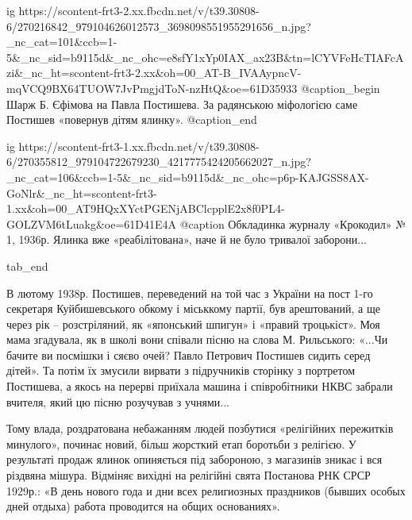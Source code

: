   ig https://scontent-frt3-2.xx.fbcdn.net/v/t39.30808-6/270216842_979104626012573_3698098551955291656_n.jpg?_nc_cat=101&ccb=1-5&_nc_sid=b9115d&_nc_ohc=e8sfY1xYp0IAX_ax23B&tn=lCYVFeHcTIAFcAzi&_nc_ht=scontent-frt3-2.xx&oh=00_AT-B_IVAAypncV-mqVCQ9BX64TUOW7JvPmgjdToN-nzHtQ&oe=61D35933
	@caption_begin
		Шарж Б. Єфімова на Павла Постишева. За радянською міфологією саме Постишев «повернув дітям ялинку».
	@caption_end

  ig https://scontent-frt3-1.xx.fbcdn.net/v/t39.30808-6/270355812_979104722679230_4217775424205662027_n.jpg?_nc_cat=106&ccb=1-5&_nc_sid=b9115d&_nc_ohc=p6p-KAJGSS8AX-GoNlr&_nc_ht=scontent-frt3-1.xx&oh=00_AT9HQxXYctPGENjABClcpplE2x8f0PL4-GOLZVM6tLuakg&oe=61D41E4A
	@caption Обкладинка журналу «Крокодил» № 1, 1936р. Ялинка вже «реабілітована», наче й не було тривалої заборони...

tab_end
\fi

\begin{zznagolos}
\normalsize
В лютому 1938р. Постишев, переведений на той час з України на пост 1-го
секретаря Куйбишевського обкому і міськкому партії, був арештований, а ще
через рік – розстріляний, як «японський шпигун» і «правий троцькіст».
Моя мама згадувала, як в школі вони співали пісню на слова М. Рильського: «...Чи
бачите ви посмішки і сяєво очей?  Павло Петрович Постишев сидить серед дітей».
Та потім їх змусили вирвати з підручників сторінку з портретом Постишева, а
якось на перерві приїхала машина і співробітники НКВС забрали вчителя, який цю
пісню розучував з учнями...
\end{zznagolos}






Тому влада, роздратована небажанням людей позбутися «релігійних пережитків
минулого», починає новий, більш жорсткий етап боротьби з релігією. У результаті
продаж ялинок опиняється під забороною, з магазинів зникає і вся різдвяна
мішура. Відміняє вихідні на релігійні свята Постанова РНК СРСР 1929р.: «В день
нового года и дни всех религиозных праздников (бывших особых дней отдыха)
работа проводится на общих основаниях».

